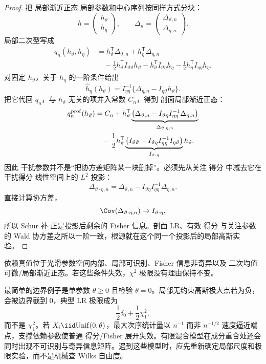 \begin{proof}
把 局部渐近正态 局部参数和中心序列按同样方式分块：
\[
 h=\begin{pmatrix}h_\vartheta\\h_\eta\end{pmatrix},
 \qquad
 \Delta_n=\begin{pmatrix}\Delta_{\vartheta,n}\\\Delta_{\eta,n}\end{pmatrix}.
\]
局部二次型写成
\begin{align*}
 q_n(h_\vartheta,h_\eta)
 &=h_\vartheta^{\mathsf T}\Delta_{\vartheta,n}
   +h_\eta^{\mathsf T}\Delta_{\eta,n}\\
 &\quad-\frac12h_\vartheta^{\mathsf T}I_{\vartheta\vartheta}h_\vartheta
   -h_\vartheta^{\mathsf T}I_{\vartheta\eta}h_\eta
   -\frac12h_\eta^{\mathsf T}I_{\eta\eta}h_\eta.
\end{align*}
对固定 $h_\vartheta$，关于 $h_\eta$ 的一阶条件给出
\[
 \widehat h_\eta(h_\vartheta)
 =I_{\eta\eta}^{-1}
 \{\Delta_{\eta,n}-I_{\eta\vartheta}h_\vartheta\}.
\]
把它代回 $q_n$，与 $h_\vartheta$ 无关的项并入常数 $C_n$，得到 剖面局部渐近正态：
\begin{align*}
 q_n^{\rm prof}(h_\vartheta)
 &=C_n
 +h_\vartheta^{\mathsf T}
 \underbrace{\left(
 \Delta_{\vartheta,n}
 -I_{\vartheta\eta}I_{\eta\eta}^{-1}\Delta_{\eta,n}
 \right)}_{\Delta_{\vartheta\cdot\eta,n}}\\
 &\quad-\frac12h_\vartheta^{\mathsf T}
 \underbrace{\left(
 I_{\vartheta\vartheta}
 -I_{\vartheta\eta}I_{\eta\eta}^{-1}I_{\eta\vartheta}
 \right)}_{I_{\vartheta\cdot\eta}}
 h_\vartheta.
\end{align*}
因此 干扰参数并不是“把协方差矩阵某一块删掉”。必须先从关注 得分 中减去它在 干扰得分 线性空间上的 $L^2$ 投影：
\[
 \Delta_{\vartheta\cdot\eta,n}
 =\Delta_{\vartheta,n}
 -I_{\vartheta\eta}I_{\eta\eta}^{-1}\Delta_{\eta,n}.
\]
直接计算协方差，
\[
 \Cov(\Delta_{\vartheta\cdot\eta,n})
 \to I_{\vartheta\cdot\eta},
\]
所以 Schur 补 正是投影后剩余的 Fisher 信息。剖面 LR、有效 得分 与关注参数的 Wald 协方差之所以一阶一致，根源就在这个同一个投影后的局部高斯实验。
\end{proof}


\begin{note}[边界、参数依赖支撑与奇异模型]
 依赖真值位于光滑参数空间内部、局部可识别、Fisher 信息非奇异以及 二次均值可微/局部渐近正态。若这些条件失效，$\chi^2$ 极限没有理由保持不变。

最简单的边界例子是单参数 $\theta\ge0$ 且检验 $\theta=0$。局部无约束高斯极大点若为负，会被边界截到 $0$，典型 LR 极限成为
\[
 \frac12\delta_0+\frac12\chi^2_1,
\]
而不是 $\chi^2_1$。若 $X_i\iid\mathrm{Unif}(0,\theta)$，最大次序统计量以 $n^{-1}$ 而非 $n^{-1/2}$ 速度逼近端点，支撑依赖参数使普通 得分/Fisher 展开失效。有限混合模型在成分重合处还会同时出现不可识别与奇异信息矩阵。遇到这些模型时，应先重新确定局部尺度和极限实验，而不是机械查 Wilks 自由度。
\end{note}

